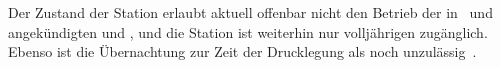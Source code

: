 \begin{newstuff}
    Der Zustand der Station erlaubt aktuell offenbar nicht den Betrieb der in~\cite{ctour} und~\cite{cbasestarbasemanual} angekündigten  und , und die Station ist weiterhin nur volljährigen zugänglich. Ebenso ist die Übernachtung zur Zeit der Drucklegung als  noch unzulässig~\cite[S. 58]{cbasebook}.
\end{newstuff}
